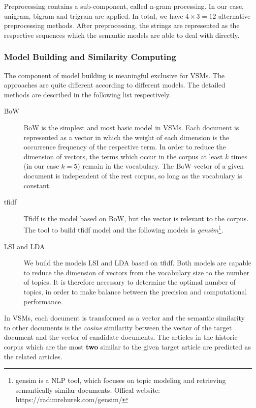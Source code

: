 Preprocessing contains a sub-component, called n-gram processing. In our case, unigram, bigram and trigram are applied. In total, we have $4 \times 3 = 12$ alternative preprocessing methods. After preprocessing, the strings are represented as the respective sequences which the semantic models are able to deal with directly. 

\subsubsection{Model Building and Similarity Computing}
The component of model building is meaningful exclusive for VSMs. The approaches are quite different according to different models.  The detailed methods are described in the following list respectively.

\begin{description}
\item[BoW] BoW is the simplest and most basic model in VSMs. Each document is represented as a vector in which the weight of each dimension is the occurrence frequency of the respective term. In order to reduce the dimension of vectors, the terms which occur in the corpus at least $k$ times (in our case $k=5$) remain in the vocabulary. The BoW vector of a given document is independent of the rest corpus, so long as the vocabulary is constant. 
\item[tfidf] Tfidf is the model based on BoW, but the vector is relevant to the corpus. The tool to build tfidf model and the following models is \textit{gensim}\footnote{gensim is a NLP tool, which focuses on topic modeling and retrieving semantically similar documents\cite{rehurek_lrec}. Offical website:  https://radimrehurek.com/gensim/}.
\item[LSI and LDA] We build the models LSI and LDA based on tfidf. Both models are capable to reduce the dimension of vectors from the vocabulary size to the number of topics. It is therefore necessary to determine the optimal number of topics, in order to make balance between the precision and computational performance. 
\end{description}

In VSMs, each document is transformed as a vector and the semantic similarity to other documents is the \textit{cosine} similarity between the vector of the target document and the vector of candidate documents. The articles in the historic corpus which are the most \textbf{two} similar to the given target article are predicted as the related articles. 

